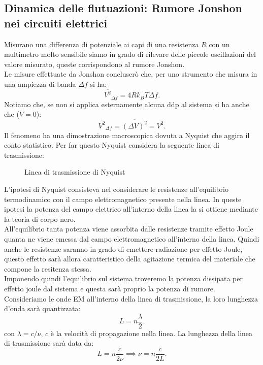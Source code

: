 \subsection{Dinamica delle flutuazioni: Rumore Jonshon nei circuiti elettrici}
\label{subsec:Dinamica delle flutuazioni: Rumore Jonshon nei circuiti elettrici}
Misurano una differenza di potenziale ai capi di una resistenza $R$ con un multimetro molto sensibile siamo in grado di rilevare delle piccole oscillazioni del valore misurato, queste corrispondono al rumore Jonshon.\\
Le misure effettuate da Jonshon concluserò che, per uno strumento che misura in una ampiezza di banda $\Delta f$ si ha:
\[
	\overline{V^2}_{\Delta f} 
	=
	4Rk_BT\Delta f
.\] 
Notiamo che, se non si applica esternamente alcuna ddp al sistema si ha anche che ($\overline{V}=0$):
\[
	\overline{V^2}_{\Delta f}
	= 
	\overline{\left( \Delta V \right) ^2}
	=
	\overline{V^2}
.\] 
Il fenomeno ha una dimostrazione macroscopica dovuta a Nyquist che aggira il conto statistico. Per far questo Nyquist considera la seguente linea di trasmissione:
\begin{figure}[H]
    \centering
    \caption{Linea di trasmissione di Nyquist}
    \label{fig:linea-di-trasmissione-di-nyquist}
\end{figure}
\noindent
L'ipotesi di Nyquist consisteva nel considerare le resistenze all'equilibrio termodinamico con il campo elettromagnetico presente nella linea. In queste ipotesi la potenza del campo elettrico all'interno della linea la si ottiene mediante la teoria di corpo nero.\\
All'equilibrio tanta potenza viene assorbita dalle resistenze tramite effetto Joule quanta ne viene emessa dal campo elettromagnetico all'interno della linea. 
Quindi anche le resistenze saranno in grado di emettere radiazione per effetto Joule, questo effetto sarà allora caratteristico della agitazione termica del materiale che compone la resitenza stessa. \\
Imponendo quindi l'equilibrio sul sistema troveremo la potenza dissipata per effetto joule dal sistema e questa sarà proprio la potenza di rumore.\\
Consideriamo le onde EM all'interno della linea di trasmissione, la loro lunghezza d'onda sarà quantizzata:
\[
	L = n \frac{\lambda}{2}
.\] 
con $\lambda = c /\nu $, $c$ è la velocità di propagazione nella linea. La lunghezza della linea di trasmissione sarà data da:
\[
	L = n \frac{c}{2\nu }
	\implies
	\nu = n \frac{c}{2L}
.\] 
